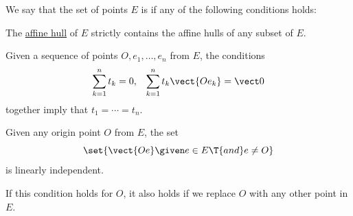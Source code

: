 \begin{definition}\label{def:affine_dependence}\mimprovised
  We say that the set of points \( E \) is  if any of the following conditions holds:

  \begin{thmenum}
     The \hyperref[def:affine_hull]{affine hull} of \( E \) strictly contains the affine hulls of any subset of \( E \).

     Given a sequence of points \( O, e_1, \ldots, e_n \) from \( E \), the conditions
    \begin{align*}
      \sum_{k=1}^n t_k = 0,
      &&
      \sum_{k=1}^n t_k \vect{O e_k} = \vect 0
    \end{align*}
    together imply that \( t_1 = \cdots = t_n \).

     Given any origin point \( O \) from \( E \), the set
    \begin{equation*}
      \set{ \vect{O e} \given e \in E \T{and} e \neq O }
    \end{equation*}
    is linearly independent.

    If this condition holds for \( O \), it also holds if we replace \( O \) with any other point in \( E \).
  \end{thmenum}
\end{definition}
